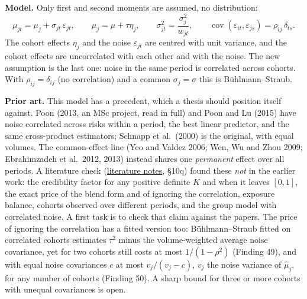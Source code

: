 \documentclass[10pt]{article}
\newcommand{\repo}{https://github.com/mikaelandblom-coder/credible-lean}
\newcommand{\hmu}{\hat\mu}
\newcommand{\cov}{\operatorname{cov}}
\begin{document}
\textbf{Model.} Only first and second moments are assumed, no distribution:
\[
  \mu_{jt} = \mu_j + \sigma_{jt}\,\varepsilon_{jt},
  \qquad \mu_j = \mu + \tau\eta_j,
  \qquad \sigma_{jt}^2 = \frac{\sigma_j^2}{w_{jt}},
  \qquad \cov(\varepsilon_{it}, \varepsilon_{js}) = \rho_{ij}\,\delta_{ts}.
\]
The cohort effects $\eta_j$ and the noise $\varepsilon_{jt}$ are centred with unit variance, and
the cohort effects are uncorrelated with each other and with the noise. The new assumption is the
last one: noise in the same period is correlated across cohorts. With $\rho_{ij} = \delta_{ij}$
(no correlation) and a common $\sigma_j = \sigma$ this is Bühlmann--Straub.

\textbf{Prior art.} This model has a precedent, which a thesis should position itself against.
Poon (2013, an MSc project, read in full) and Poon and Lu (2015) have noise correlated across
risks within a period, the best linear predictor, and the same cross-product estimators; Schnapp
et al.\ (2000) is the original, with equal volumes. The common-effect line (Yeo and Valdez 2006;
Wen, Wu and Zhou 2009; Ebrahimzadeh et al.\ 2012, 2013) instead shares one \emph{permanent} effect
over all periods. A literature check (\href{\repo/blob/main/studies/literature.md}{literature
notes}, \S10q) found these \emph{not} in the earlier work: the credibility factor for any positive
definite $K$ and when it leaves $[0, 1]$, the exact price of the blend form and of ignoring the
correlation, exposure balance, cohorts observed over different periods, and the group model with
correlated noise. A first task is to check that claim against the papers. The price of ignoring
the correlation has a fitted version too: Bühlmann--Straub fitted on correlated cohorts estimates
$\tau^2$ minus the volume-weighted average noise covariance, yet for two cohorts still costs at most
$1/(1 - \rho^2)$ (Finding 49), and with equal noise covariances $c$ at most $v_j/(v_j - c)$, $v_j$ the noise variance of $\hmu_j$, for any number
of cohorts (Finding 50). A sharp bound for three or more cohorts with unequal covariances is open.
\end{document}
